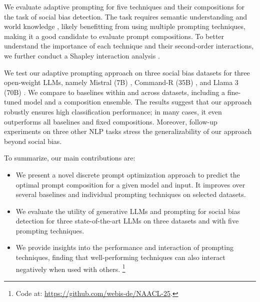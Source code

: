 We evaluate adaptive prompting for five techniques and their compositions for the task of social bias detection. The task requires semantic understanding and world knowledge \cite{zhou2023a}, likely benefitting from using multiple prompting techniques, making it a good candidate to evaluate prompt compositions. To better understand the importance of each technique and their second-order interactions, we further conduct a Shapley interaction analysis \cite{fumagalli2023}.

We test our adaptive prompting approach on three social bias datasets for three open-weight LLMs, namely Mistral (7B) \cite{jiang2023}, Command-R (35B) \cite{cohereforai2024}, and Llama 3 (70B) \cite{dubey2024}. We compare to baselines within and across datasets, including a fine-tuned model and a composition ensemble. The results suggest that our approach robustly ensures high classification performance; in many cases, it even outperforms all baselines and fixed compositions. Moreover, follow-up experiments on three other NLP tasks stress the generalizability of our approach beyond social bias.

To summarize, our main contributions are:
\begin{itemize}
\setlength{\itemsep}{0pt}
    \item We present a novel discrete prompt optimization approach to predict the optimal prompt composition for a given model and input. It improves over several baselines and individual prompting techniques on selected datasets.
    \item We evaluate the utility of generative LLMs and prompting for social bias detection for three state-of-the-art LLMs on three datasets and with five prompting techniques.
    \item We provide insights into the performance and interaction of prompting techniques, finding that well-performing techniques can also interact negatively when used with others.%
\footnote{Code at: \url{https://github.com/webis-de/NAACL-25}.}
\end{itemize}
